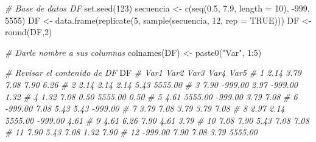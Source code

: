 \documentclass[
]{article}
\newenvironment{Shaded}{\begin{snugshade}}{\end{snugshade}}
\newcommand{\AttributeTok}[1]{\textcolor[rgb]{0.77,0.63,0.00}{#1}}
\newcommand{\CommentTok}[1]{\textcolor[rgb]{0.56,0.35,0.01}{\textit{#1}}}
\newcommand{\ConstantTok}[1]{\textcolor[rgb]{0.00,0.00,0.00}{#1}}
\newcommand{\DecValTok}[1]{\textcolor[rgb]{0.00,0.00,0.81}{#1}}
\newcommand{\FloatTok}[1]{\textcolor[rgb]{0.00,0.00,0.81}{#1}}
\newcommand{\FunctionTok}[1]{\textcolor[rgb]{0.00,0.00,0.00}{#1}}
\newcommand{\NormalTok}[1]{#1}
\newcommand{\OtherTok}[1]{\textcolor[rgb]{0.56,0.35,0.01}{#1}}
\newcommand{\SpecialCharTok}[1]{\textcolor[rgb]{0.00,0.00,0.00}{#1}}
\newcommand{\StringTok}[1]{\textcolor[rgb]{0.31,0.60,0.02}{#1}}
\theoremstyle{definition}
\theoremstyle{definition}
\theoremstyle{definition}
\theoremstyle{definition}
\theoremstyle{remark}
\begin{document}
\begin{Shaded}
\begin{Highlighting}[]
\CommentTok{\# Base de datos DF}
\FunctionTok{set.seed}\NormalTok{(}\DecValTok{123}\NormalTok{)}
\NormalTok{secuencia }\OtherTok{\textless{}{-}} \FunctionTok{c}\NormalTok{(}\FunctionTok{seq}\NormalTok{(}\FloatTok{0.5}\NormalTok{, }\FloatTok{7.9}\NormalTok{, }\AttributeTok{length =} \DecValTok{10}\NormalTok{), }\SpecialCharTok{{-}}\DecValTok{999}\NormalTok{, }\DecValTok{5555}\NormalTok{)}
\NormalTok{DF }\OtherTok{\textless{}{-}} \FunctionTok{data.frame}\NormalTok{(}\FunctionTok{replicate}\NormalTok{(}\DecValTok{5}\NormalTok{, }
                           \FunctionTok{sample}\NormalTok{(secuencia, }\DecValTok{12}\NormalTok{, }\AttributeTok{rep =} \ConstantTok{TRUE}\NormalTok{)))}
\NormalTok{DF }\OtherTok{\textless{}{-}} \FunctionTok{round}\NormalTok{(DF,}\DecValTok{2}\NormalTok{)}

\CommentTok{\# Darle nombre a sus columnas}
\FunctionTok{colnames}\NormalTok{(DF) }\OtherTok{\textless{}{-}} \FunctionTok{paste0}\NormalTok{(}\StringTok{"Var"}\NormalTok{, }\DecValTok{1}\SpecialCharTok{:}\DecValTok{5}\NormalTok{)}

\CommentTok{\# Revisar el contenido de DF}
\NormalTok{DF }
\CommentTok{\#       Var1    Var2    Var3    Var4    Var5}
\CommentTok{\# 1     2.14    3.79    7.08    7.90    6.26}
\CommentTok{\# 2     2.14    2.14    2.14    5.43 5555.00}
\CommentTok{\# 3     7.90 {-}999.00    2.97 {-}999.00    1.32}
\CommentTok{\# 4     1.32    7.08    0.50 5555.00    0.50}
\CommentTok{\# 5     4.61 5555.00 {-}999.00    3.79    7.08}
\CommentTok{\# 6  {-}999.00    7.08    5.43    5.43 {-}999.00}
\CommentTok{\# 7     3.79    7.08    3.79    3.79    7.08}
\CommentTok{\# 8     2.97    2.14 5555.00 {-}999.00    4.61}
\CommentTok{\# 9     4.61    6.26    7.90    4.61    3.79}
\CommentTok{\# 10    7.08    7.90    5.43    7.08    7.08}
\CommentTok{\# 11    7.90    5.43    7.08    1.32    7.90}
\CommentTok{\# 12 {-}999.00    7.90    7.08    3.79 5555.00}
\end{Highlighting}
\end{Shaded}
\end{document}

